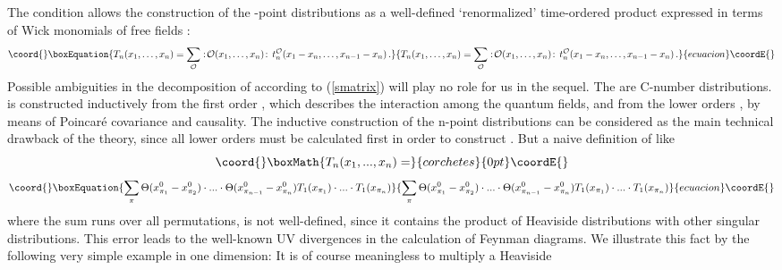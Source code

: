 \documentclass[a4paper,11pt]{article}
\begin{document}
The condition allows the construction of
the \coordHE{}-point distributions \coordHE{} as a  well-defined  `renormalized'
time-ordered product expressed 
in terms of Wick monomials of free fields \coordHE{}:
\begin{equation}\coord{}\boxEquation{
T_{n}(x_{1},\ldots, x_{n})=\sum_{ { \cal{ O}}} :\!{\cal 
O}(x_{1},\ldots,x_{n})\!:\,
t_{n}^{{ \cal O}}(x_{1}-x_{n},\ldots,x_{n-1}-x_{n})\,. \label{smatrix}
}{
T_{n}(x_{1},\ldots, x_{n})=\sum_{ { \cal{ O}}} :\!{\cal 
O}(x_{1},\ldots,x_{n})\!:\,
t_{n}^{{ \cal O}}(x_{1}-x_{n},\ldots,x_{n-1}-x_{n})\,. }{ecuacion}\coordE{}\end{equation}
Possible ambiguities in the decomposition of \coordHE{} according to
({\ref{smatrix}}) will play no role for us in the sequel.
The \coordHE{} are C-number distributions. \coordHE{} is constructed inductively from 
the first order \coordHE{},
which describes the interaction among the quantum fields,  and from 
the lower orders \coordHE{}, \coordHE{} by means of Poincar\'e
covariance and causality.
The inductive construction of the n-point distributions \coordHE{}
can be considered
as the main technical drawback of the theory, since all lower orders
\coordHE{} must be calculated first in order to construct \coordHE{}.
But a naive definition of \coordHE{} like
\begin{displaymath}\coord{}\boxMath{
T_n(x_1,...,x_n)=
}{corchetes}{0pt}\coordE{}\end{displaymath}
\begin{equation}\coord{}\boxEquation{
\sum_{\pi} \Theta(x_{\pi_1}^0-x_{\pi_2}^0)\cdot ...
\cdot \Theta(x_{\pi_{n-1}}^0-x_{\pi_n}^0) T_1(x_{\pi_1})\cdot ... \cdot
T_1(x_{\pi_n})
}{
\sum_{\pi} \Theta(x_{\pi_1}^0-x_{\pi_2}^0)\cdot ...
\cdot \Theta(x_{\pi_{n-1}}^0-x_{\pi_n}^0) T_1(x_{\pi_1})\cdot ... \cdot
T_1(x_{\pi_n})
}{ecuacion}\coordE{}\end{equation}
where the sum runs over all \coordHE{} permutations,
is not well-defined, since it contains the product of Heaviside
distributions with other singular distributions. This error leads to the
well-known UV divergences in the calculation of Feynman diagrams.
We illustrate this fact by the following very simple example in one
dimension:
It is of course meaningless to multiply a Heaviside
\end{document}

